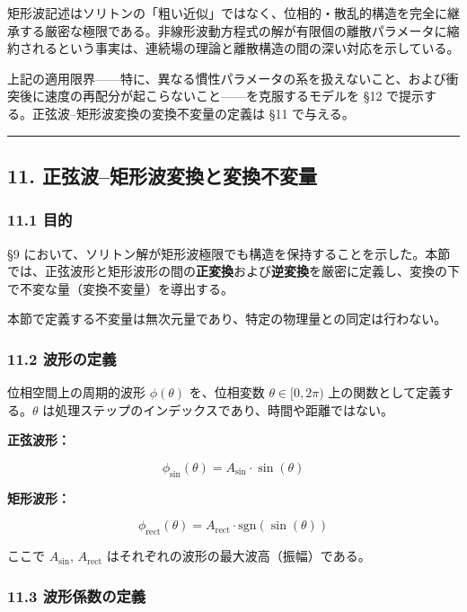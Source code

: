 \documentclass[a4paper,11pt]{ltjsarticle}
\begin{document}
矩形波記述はソリトンの「粗い近似」ではなく、位相的・散乱的構造を完全に継承する厳密な極限である。非線形波動方程式の解が有限個の離散パラメータに縮約されるという事実は、連続場の理論と離散構造の間の深い対応を示している。

上記の適用限界------特に、異なる慣性パラメータの系を扱えないこと、および衝突後に速度の再配分が起こらないこと------を克服するモデルを
§12 で提示する。正弦波--矩形波変換の変換不変量の定義は §11 で与える。

\begin{center}\rule{0.5\linewidth}{0.5pt}\end{center}

\subsection{11.
正弦波--矩形波変換と変換不変量}\label{ux6b63ux5f26ux6ce2ux77e9ux5f62ux6ce2ux5909ux63dbux3068ux5909ux63dbux4e0dux5909ux91cf}

\subsubsection{11.1 目的}\label{ux76eeux7684-1}

§9
において、ソリトン解が矩形波極限でも構造を保持することを示した。本節では、正弦波形と矩形波形の間の\textbf{正変換}および\textbf{逆変換}を厳密に定義し、変換の下で不変な量（変換不変量）を導出する。

本節で定義する不変量は無次元量であり、特定の物理量との同定は行わない。

\subsubsection{11.2 波形の定義}\label{ux6ce2ux5f62ux306eux5b9aux7fa9}

位相空間上の周期的波形 \(\phi(\theta)\) を、位相変数
\(\theta \in [0, 2\pi)\) 上の関数として定義する。\(\theta\)
は処理ステップのインデックスであり、時間や距離ではない。

\textbf{正弦波形：}

\[\phi_{\sin}(\theta) = A_{\sin} \cdot \sin(\theta) \tag{W1}\]

\textbf{矩形波形：}

\[\phi_{\text{rect}}(\theta) = A_{\text{rect}} \cdot \mathrm{sgn}(\sin(\theta)) \tag{W2}\]

ここで \(A_{\sin}\), \(A_{\text{rect}}\)
はそれぞれの波形の最大波高（振幅）である。

\subsubsection{11.3
波形係数の定義}\label{ux6ce2ux5f62ux4fc2ux6570ux306eux5b9aux7fa9}
\end{document}
